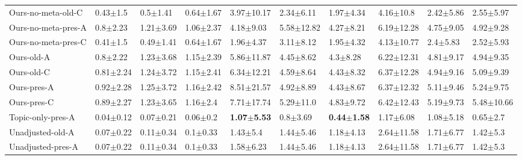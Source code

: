 \begin{tabular}{llllllllll}
Ours-no-meta-old-C  &            0.43$\pm$1.5 &            0.5$\pm$1.41 &           0.64$\pm$1.67 &          3.97$\pm$10.17 &           2.34$\pm$6.11 &           1.97$\pm$4.34 &           4.16$\pm$10.8 &           2.42$\pm$5.86 &           2.55$\pm$5.97 \\
Ours-no-meta-pres-A &            0.8$\pm$2.23 &           1.21$\pm$3.69 &           1.06$\pm$2.37 &           4.18$\pm$9.03 &          5.58$\pm$12.82 &           4.27$\pm$8.21 &          6.19$\pm$12.28 &           4.75$\pm$9.05 &           4.92$\pm$9.28 \\
Ours-no-meta-pres-C &            0.41$\pm$1.5 &           0.49$\pm$1.41 &           0.64$\pm$1.67 &           1.96$\pm$4.37 &           3.11$\pm$8.12 &           1.95$\pm$4.32 &          4.13$\pm$10.77 &            2.4$\pm$5.83 &           2.52$\pm$5.93 \\
Ours-old-A          &            0.8$\pm$2.22 &           1.23$\pm$3.68 &           1.15$\pm$2.39 &          5.86$\pm$11.87 &           4.45$\pm$8.62 &            4.3$\pm$8.28 &          6.22$\pm$12.31 &           4.81$\pm$9.17 &           4.94$\pm$9.35 \\
Ours-old-C          &           0.81$\pm$2.24 &           1.24$\pm$3.72 &           1.15$\pm$2.41 &          6.34$\pm$12.21 &           4.59$\pm$8.64 &           4.43$\pm$8.32 &          6.37$\pm$12.28 &           4.94$\pm$9.16 &           5.09$\pm$9.39 \\
Ours-pres-A         &           0.92$\pm$2.28 &           1.25$\pm$3.72 &           1.16$\pm$2.42 &          8.51$\pm$21.57 &           4.92$\pm$8.89 &           4.43$\pm$8.67 &          6.37$\pm$12.32 &           5.11$\pm$9.46 &           5.24$\pm$9.75 \\
Ours-pres-C         &           0.89$\pm$2.27 &           1.23$\pm$3.65 &            1.16$\pm$2.4 &          7.71$\pm$17.74 &           5.29$\pm$11.0 &           4.83$\pm$9.72 &          6.42$\pm$12.43 &           5.19$\pm$9.73 &          5.48$\pm$10.66 \\
Topic-only-pres-A   &           0.04$\pm$0.12 &           0.07$\pm$0.21 &            0.06$\pm$0.2 &  \textbf{1.07$\pm$5.53} &            0.8$\pm$3.69 &  \textbf{0.44$\pm$1.58} &           1.17$\pm$6.08 &           1.08$\pm$5.18 &            0.65$\pm$2.7 \\
Unadjusted-old-A    &           0.07$\pm$0.22 &           0.11$\pm$0.34 &            0.1$\pm$0.33 &            1.43$\pm$5.4 &           1.44$\pm$5.46 &           1.18$\pm$4.13 &          2.64$\pm$11.58 &           1.71$\pm$6.77 &            1.42$\pm$5.3 \\
Unadjusted-pres-A   &           0.07$\pm$0.22 &           0.11$\pm$0.34 &            0.1$\pm$0.33 &           1.58$\pm$6.23 &           1.44$\pm$5.46 &           1.18$\pm$4.13 &          2.64$\pm$11.58 &           1.71$\pm$6.77 &            1.42$\pm$5.3 \\
\bottomrule
\end{tabular}
